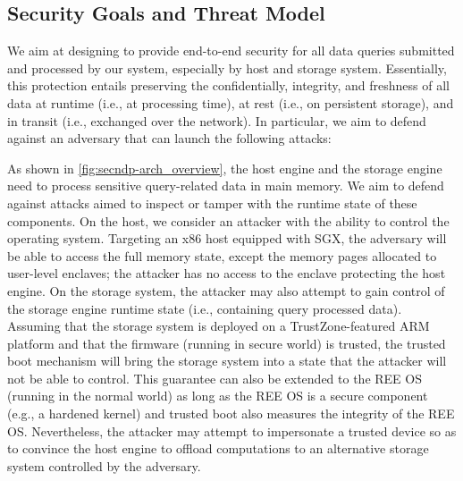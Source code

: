 \subsection{Security Goals and Threat Model}
\label{overview:threat-model}
We aim at designing \project{} to provide end-to-end security for all data queries submitted and processed by our system, especially by host and storage system. Essentially, this protection entails preserving the confidentially, integrity, and freshness of all data at runtime (i.e., at processing time), at rest (i.e., on persistent storage), and in transit (i.e., exchanged over the network). In particular, we aim to defend against an adversary that can launch the following attacks:

 As shown in \autoref{fig:secndp-arch_overview}, the host engine and the storage engine need to process sensitive query-related data in main memory. We aim to defend against attacks aimed to inspect or tamper with the runtime state of these components. On the host, we consider an attacker with the ability to control the operating system. Targeting an x86 host equipped with SGX, the adversary will be able to access the full memory state, except the memory pages allocated to user-level enclaves; the attacker has no access to the enclave protecting the host engine. %
On the storage system, the attacker may also attempt to gain control of the storage engine runtime state (i.e., containing query processed data). Assuming that the storage system is deployed on a TrustZone-featured ARM platform and that the firmware (running in secure world) is trusted, the trusted boot mechanism will bring the storage system into a state that the attacker will not be able to control. This guarantee can also be extended to the REE OS (running in the normal world) as long as the REE OS is a secure component (e.g., a hardened kernel) and trusted boot also measures the integrity of the REE OS. Nevertheless, the attacker may attempt to impersonate a trusted device so as to convince the host engine to offload computations to an alternative storage system controlled by the adversary.




